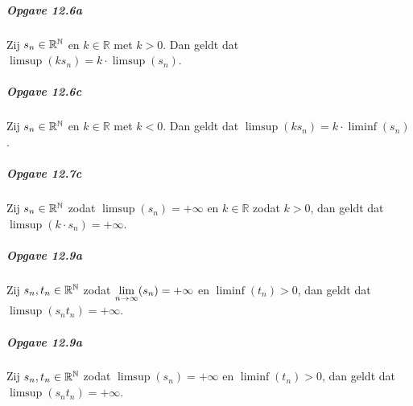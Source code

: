 \subparagraph{Opgave 12.6a} Zij $s_{n}\in\mathbb{R}^{\mathbb{N}}$ en $k\in\mathbb{R}$ met $k>0$. Dan geldt dat $\limsup(ks_{n})=k\cdot\limsup(s_{n})$.

\subparagraph{Opgave 12.6c} Zij $s_{n}\in\mathbb{R}^{\mathbb{N}}$ en $k\in\mathbb{R}$ met $k<0$. Dan geldt dat $\limsup(ks_{n})=k\cdot\liminf(s_{n})$.

\subparagraph{Opgave 12.7c} Zij $s_{n}\in\mathbb{R}^{\mathbb{N}}$ zodat $\limsup(s_{n})=+\infty$ en $k\in\mathbb{R}$ zodat $k>0$, dan geldt dat $\limsup(k \cdot s_{n})=+\infty$.

\subparagraph{Opgave 12.9a} Zij $s_{n},t_{n}\in\mathbb{R}^{\mathbb{N}}$ zodat $\underset{n\to\infty}{\text{lim}}(s_{n})=+\infty$ en $\liminf(t_{n})>0$, dan geldt dat $\limsup(s_{n}t_{n})=+\infty$.

\subparagraph{Opgave 12.9a} Zij $s_{n},t_{n}\in\mathbb{R}^{\mathbb{N}}$ zodat $\limsup(s_{n})=+\infty$ en $\liminf(t_{n})>0$, dan geldt dat $\limsup(s_{n}t_{n})=+\infty$.